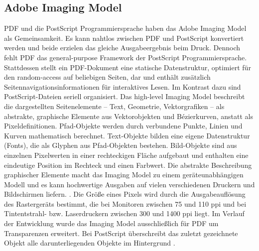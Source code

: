 \subsection{Adobe Imaging Model}
PDF und die PostScript Programmiersprache haben das Adobe Imaging Model als Gemeinsamkeit. Es kann nahtlos zwischen PDF und PostScript konvertiert werden und beide erzielen das gleiche Ausgabeergebnis beim Druck. Dennoch fehlt PDF das general-purpose Framework der PostScript Programmiersprache. Stattdessen stellt ein PDF-Dokument eine statische Datenstruktur, optimiert für den random-access auf beliebigen Seiten, dar und enthält zusätzlich Seitennavigationsinformationen für interaktives Lesen. Im Kontrast dazu sind PostScript-Dateien seriell organisiert. Das high-level Imaging Model beschreibt die dargestellten Seitenelemente – Text, Geometrie, Vektorgrafiken – als abstrakte, graphische Elemente aus Vektorobjekten und Bézierkurven, anstatt als Pixeldefinitionen. Pfad-Objekte werden durch verbundene Punkte, Linien und Kurven mathematisch berechnet. Text-Objekte bilden eine eigene Datenstruktur (Fonts), die als Glyphen aus Pfad-Objekten bestehen. Bild-Objekte sind aus einzelnen Pixelwerten in einer rechteckigen Fläche aufgebaut und enthalten eine eindeutige Position im Rechteck und einen Farbwert. Die abstrakte Beschreibung graphischer Elemente macht das Imaging Model zu einem geräteunabhängigen Modell und es kann hochwertige Ausgaben auf vielen verschiedenen Druckern und Bildschirmen liefern. \cite{adobe-postscript}. Die Größe eines Pixels wird durch die Ausgabeauflösung des Rastergeräts bestimmt, die bei Monitoren zwischen 75 und 110 \gls{ppi} und bei Tintentstrahl- bzw. Laserdruckern zwischen 300 und 1400 \gls{ppi} liegt. Im Verlauf der Entwicklung wurde das Imaging Model ausschließlich für PDF um Transparenzen erweitert. Bei PostScript überschreibt das zuletzt gezeichnete Objekt alle darunterliegenden Objekte im Hintergrund \cite{schneeberger}. 

